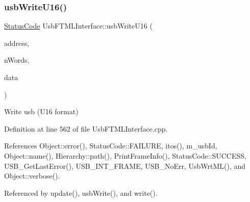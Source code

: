 \subsubsection{\texorpdfstring{usb\+Write\+U16()}{usbWriteU16()}}
{\footnotesize\ttfamily \hyperlink{classStatusCode}{Status\+Code} Usb\+F\+T\+M\+L\+Interface\+::usb\+Write\+U16 (\begin{DoxyParamCaption}\item[{unsigned long int}]{address,  }\item[{unsigned long int}]{n\+Words,  }\item[{unsigned short $\ast$}]{data }\end{DoxyParamCaption})}

Write usb (U16 format) 

Definition at line 562 of file Usb\+F\+T\+M\+L\+Interface.\+cpp.



References Object\+::error(), Status\+Code\+::\+F\+A\+I\+L\+U\+RE, itos(), m\+\_\+usb\+Id, Object\+::name(), Hierarchy\+::path(), Print\+Frame\+Info(), Status\+Code\+::\+S\+U\+C\+C\+E\+SS, U\+S\+B\+\_\+\+Get\+Last\+Error(), U\+S\+B\+\_\+\+I\+N\+T\+\_\+\+F\+R\+A\+ME, U\+S\+B\+\_\+\+No\+Err, Usb\+Wrt\+M\+L(), and Object\+::verbose().



Referenced by update(), usb\+Write(), and write().


